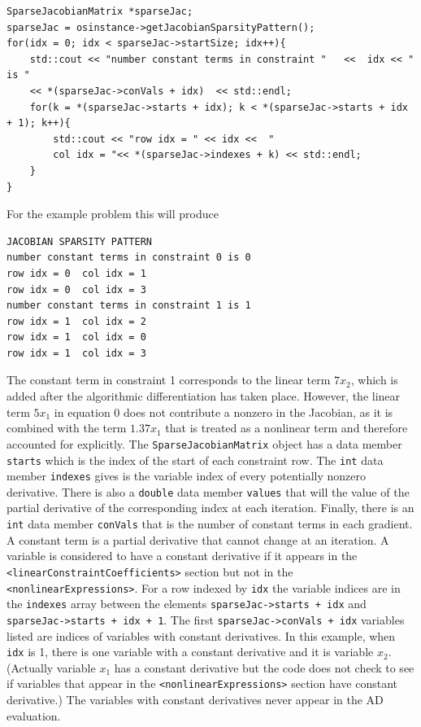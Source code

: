 \documentclass[11pt]{article}
\renewcommand{\_}{{\char"5F}}
\renewcommand{\{}{{\char"7B}}
\renewcommand{\}}{{\char"7D}}
\renewcommand{\^}{{\char"0D}}
\renewcommand{\'}{{\char"0D}}
\begin{document}
\begin{enumerate}[Step 1:]
\begin{verbatim}
SparseJacobianMatrix *sparseJac;
sparseJac = osinstance->getJacobianSparsityPattern();
for(idx = 0; idx < sparseJac->startSize; idx++){
    std::cout << "number constant terms in constraint "   <<  idx << " is "
    << *(sparseJac->conVals + idx)  << std::endl;
    for(k = *(sparseJac->starts + idx); k < *(sparseJac->starts + idx + 1); k++){
        std::cout << "row idx = " << idx <<  "
        col idx = "<< *(sparseJac->indexes + k) << std::endl;
    }
}
\end{verbatim}

For the example problem this will produce

\begin{verbatim}
JACOBIAN SPARSITY PATTERN
number constant terms in constraint 0 is 0
row idx = 0  col idx = 1
row idx = 0  col idx = 3
number constant terms in constraint 1 is 1
row idx = 1  col idx = 2
row idx = 1  col idx = 0
row idx = 1  col idx = 3
\end{verbatim}

The   constant term in constraint 1 corresponds to the linear term $7x_2$,
which is added after the algorithmic differentiation has taken place.
However, the linear  term $5x_1$ in equation 0 does not
contribute a nonzero in the Jacobian, as it is combined with the
term $1.37x_1$ that is treated as a nonlinear term and
therefore accounted for explicitly.
The {\tt SparseJacobianMatrix} object has a data member {\tt starts}
which is the index of the start of each constraint row.
The {\tt int} data member {\tt indexes}  gives  is the variable index
of every potentially nonzero derivative. There is also a {\tt double} data member
{\tt values} that will the value of the partial derivative of the corresponding
index at each iteration. Finally, there is an {\tt int} data member
{\tt conVals} that is the number of constant terms in each gradient.
A constant term is a partial derivative that cannot change at an iteration.
A variable is considered to have a constant derivative
if it appears in the {\tt <linearConstraintCoefficients>} section
but not in the {\tt <nonlinearExpressions>}.  For a row indexed by {\tt idx}
the variable indices are in the  {\tt indexes} array between the elements
{\tt sparseJac->starts + idx} and {\tt sparseJac->starts + idx + 1}.
The first  {\tt sparseJac->conVals + idx} variables listed are indices
of  variables with constant derivatives. In this example, when {\tt idx} is 1,
there is one  variable with a constant derivative and it is variable $x_{2}$.
(Actually variable $x_{1}$ has a constant derivative but the code does not check
to see if variables that appear in the {\tt <nonlinearExpressions>} section
have constant derivative.) The  variables with constant derivatives
never appear in the AD evaluation.


\end{enumerate}
\end{document}
